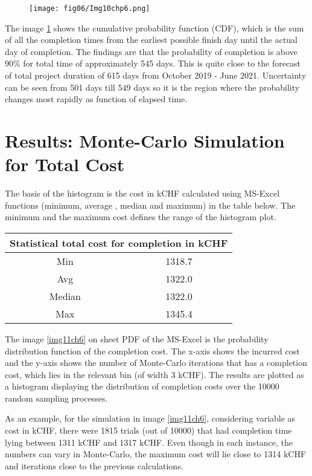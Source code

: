 \begin{figure}
	\centering
	\texttt{[image: fig06/Img10chp6.png]}
	\label{img10ch6}
\end{figure}


The image \ref{img10ch6} shows the cumulative probability function (CDF), which is the sum of all the completion times from the earliest possible finish day until the actual day of completion. The findings are that the probability of completion is above 90\% 
for total time of approximately 545 days. This is quite close to the forecast of total project duration of 615 days from October 2019 - June 2021. Uncertainty can be seen from 501 days till 549 days so it is the region where the probability changes most rapidly as function of elapsed time.


\section{Results: Monte-Carlo Simulation for  Total Cost}\label{section6.2}

The basis of the histogram is the cost in kCHF calculated using MS-Excel functions (minimum, average , median and maximum) in the table below. The minimum and the maximum cost defines the range of the histogram plot.
\begin{center}
	\begin{tabular}{ |c|c|} 
		\hline
		\multicolumn{2}{|c|}{Statistical total cost for completion in kCHF} \\
		\hline
		Min & 1318.7  \\
		\hline
		Avg &  1322.0\\ 
		\hline
		Median & 1322.0 \\ 
		\hline
		Max & 1345.4\\ 
		\hline
	\end{tabular}
\end{center}


The image \ref{img11ch6} on sheet PDF of the MS-Excel is the probability distribution function of the completion cost. The x-axis shows the incurred cost and the y-axis shows the number of Monte-Carlo iterations that has a completion cost, which lies in the relevant bin (of width 3 kCHF). The
results are plotted as a histogram displaying the distribution of completion costs over the 10000 random sampling processes. 

As an example, for the simulation in image \ref{img11ch6}, considering variable as cost in kCHF, there were 1815 trials (out of 10000) that had completion time lying between 1311 kCHF and 1317 kCHF. Even though in each instance, the numbers can vary in Monte-Carlo, the maximum cost will lie close to 1314 kCHF and iterations close to the previous calculations.

